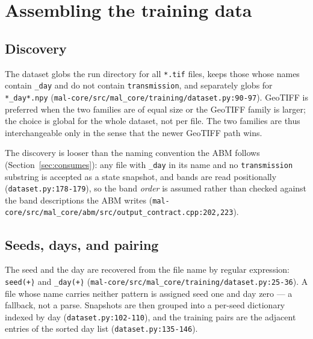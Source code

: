 \documentclass[11pt,a4paper]{article}
\newcommand{\codex}[1]{\texttt{#1}}
\begin{document}
\section{Assembling the training data}

\label{sec:data}

\subsection{Discovery}

The dataset globs the run directory for all \codex{*.tif} files, keeps those
whose names contain \codex{\_\allowbreak{}day} and do not contain \codex{transmission}, and
separately globs for \codex{*\_\allowbreak{}day*.npy}
(\codex{mal-core/\allowbreak{}src/\allowbreak{}mal\_\allowbreak{}core/\allowbreak{}training/\allowbreak{}dataset.py:90-97}). GeoTIFF is preferred
when the two families are of equal size or the GeoTIFF family is larger; the
choice is global for the whole dataset, not per file. The two families are
thus interchangeable only in the sense that the newer GeoTIFF path wins.

The discovery is looser than the naming convention the ABM follows
(Section~\ref{sec:consumes}): any file with \codex{\_\allowbreak{}day} in its name and no
\codex{transmission} substring is accepted as a state snapshot, and bands are
read positionally (\codex{dataset.py:178-179}), so the band \emph{order} is
assumed rather than checked against the band descriptions the ABM writes
(\codex{mal-core/\allowbreak{}src/\allowbreak{}mal\_\allowbreak{}core/\allowbreak{}abm/\allowbreak{}src/\allowbreak{}output\_\allowbreak{}contract.cpp:202,223}).

\subsection{Seeds, days, and pairing}

The seed and the day are recovered from the file name by regular expression:
\codex{seed(\d+)} and \codex{\_\allowbreak{}day(\d+)}
(\codex{mal-core/\allowbreak{}src/\allowbreak{}mal\_\allowbreak{}core/\allowbreak{}training/\allowbreak{}dataset.py:25-36}). A file whose name
carries neither pattern is assigned seed one and day zero --- a fallback, not
a parse. Snapshots are then grouped into a per-seed dictionary indexed by day
(\codex{dataset.py:102-110}), and the training pairs are the adjacent entries
of the sorted day list (\codex{dataset.py:135-146}).
\end{document}

